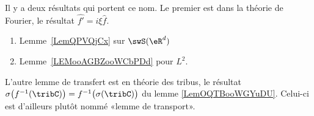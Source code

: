 
      \label{THEMEooJREIooKEdMOl}

Il y a deux résultats qui portent ce nom. Le premier est dans la théorie de Fourier, le résultat \( \hat{f'}=i\xi \hat{f}\).
\begin{enumerate}
	\item
	      Lemme~\ref{LemQPVQjCx} sur \( \swS(\eR^d)\)
	\item
	      Lemme~\ref{LEMooAGBZooWCbPDd} pour \( L^2\).
\end{enumerate}

L'autre lemme de transfert est en théorie des tribus, le résultat \( \sigma\big( f^{-1}(\tribC) \big)=f^{-1}\big( \sigma(\tribC) \big)\) du lemme \ref{LemOQTBooWGYuDU}. Celui-ci est d'ailleurs plutôt nommé «lemme de transport».


